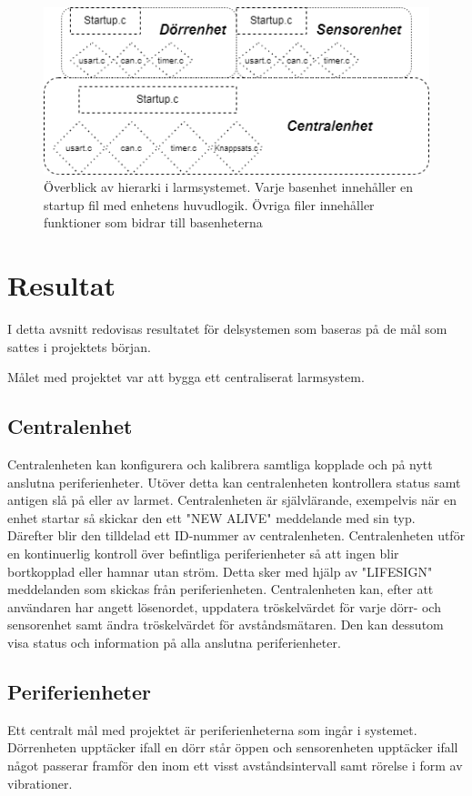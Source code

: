 \documentclass{article}
\begin{document}
\begin{figure}[h]
    \centering
    \includegraphics[scale=0.5]{Projektrapport/hierarki.png}
    \caption {Överblick av hierarki i larmsystemet. Varje basenhet innehåller en startup fil med enhetens huvudlogik. Övriga filer innehåller funktioner som bidrar till basenheterna}
    \label{fig:drawing}
\end{figure}


\section{Resultat}
I detta avsnitt redovisas resultatet för delsystemen som baseras på de mål som sattes i projektets början.

Målet med projektet var att bygga ett centraliserat larmsystem.
\subsection{Centralenhet}
Centralenheten kan konfigurera och kalibrera samtliga kopplade och på nytt anslutna periferienheter.
Utöver detta kan centralenheten kontrollera status samt antigen slå på eller av larmet. 
Centralenheten är självlärande, exempelvis när en enhet startar så skickar den ett "NEW ALIVE" meddelande med sin typ. 
Därefter blir den tilldelad ett ID-nummer av centralenheten. 
Centralenheten utför en kontinuerlig kontroll över befintliga periferienheter så att ingen blir bortkopplad eller hamnar utan ström. 
Detta sker med hjälp av "LIFESIGN" meddelanden som skickas från periferienheten. 
Centralenheten kan, efter att användaren har angett lösenordet, uppdatera tröskelvärdet för varje dörr- och sensorenhet samt ändra tröskelvärdet för avståndsmätaren. 
Den kan dessutom visa status och information på alla anslutna periferienheter.

\subsection{Periferienheter}
Ett centralt mål med projektet är periferienheterna som ingår i systemet. 
Dörrenheten upptäcker ifall en dörr står öppen och sensorenheten upptäcker ifall något passerar framför den inom ett visst avståndsintervall samt rörelse i form av vibrationer.
\end{document}
